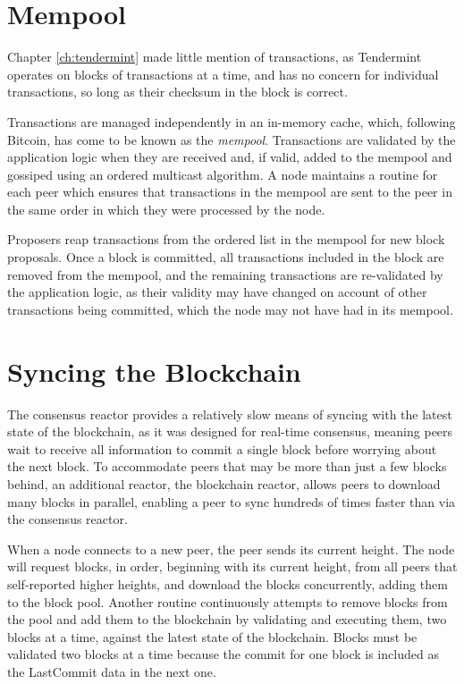 \section{Mempool}

Chapter \ref{ch:tendermint} made little mention of transactions, 
as Tendermint operates on blocks of transactions at a time, and has no concern for individual transactions,
so long as their checksum in the block is correct.

Transactions are managed independently in an in-memory cache, 
which, following Bitcoin, has come to be known as the \emph{mempool}.
Transactions are validated by the application logic when they are received and, if valid, 
added to the mempool and gossiped using an ordered multicast algorithm.
A node maintains a routine for each peer which ensures that transactions 
in the mempool are sent to the peer in the same order in which they were processed by the node.

Proposers reap transactions from the ordered list in the mempool for new block proposals.
Once a block is committed, all transactions included in the block are removed from the mempool,
and the remaining transactions are re-validated by the application logic,
as their validity may have changed on account of other transactions being committed, 
which the node may not have had in its mempool.

\section{Syncing the Blockchain}

The consensus reactor provides a relatively slow means of syncing with the latest state of the blockchain,
as it was designed for real-time consensus,
meaning peers wait to receive all information to commit a single block before worrying about the next block.
To accommodate peers that may be more than just a few blocks behind, 
an additional reactor, the blockchain reactor, allows peers to download many blocks in parallel,
enabling a peer to sync hundreds of times faster than via the consensus reactor.

When a node connects to a new peer, the peer sends its current height.
The node will request blocks, in order, beginning with its current height,
from all peers that self-reported higher heights, and download the blocks concurrently, adding them to the block pool.
Another routine continuously attempts to remove blocks from the pool and add them to the blockchain by validating and executing them, 
two blocks at a time, against the latest state of the blockchain.
Blocks must be validated two blocks at a time because the commit for one block is included as the LastCommit data in the next one.

